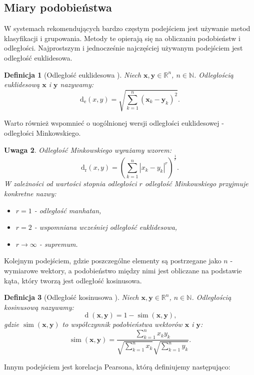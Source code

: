 \documentclass[12pt,a4paper]{report}
\newtheorem{df}{Definicja}[chapter]
\newtheorem{uwaga}[df]{Uwaga}
\newcommand{\setR}{\mathbb{R}}
\newcommand{\setN}{\mathbb{N}}
\newcommand{\similarity}[2]{\operatorname{sim}\left({#1}, {#2} \right)}
\newcommand{\distance}[2]{\operatorname{d}\left({#1}, {#2} \right)}
\newcommand{\distancee}[2]{\operatorname{d_r}\left({#1}, {#2} \right)}
\newcommand{\distanceee}[2]{\operatorname{d_e}\left({#1}, {#2} \right)}
\begin{document}
\subsection{Miary podobieństwa}
W systemach rekomendujących bardzo częstym podejściem jest używanie metod klasyfikacji i grupowania. Metody te opierają się na obliczaniu podobieństw i odległości.
Najprostszym i jednocześnie najczęściej używanym podejściem jest odległość euklidesowa.

\begin{df}[Odległość euklidesowa \citep{rsh}]%

Niech $\mathbf{x},\mathbf{y} \in \setR^n $, $n \in\setN$. Odległością euklidesową $\mathbf{x}$ i $\mathbf{y}$ nazywamy:
$$
\distanceee{x}{y} = \sqrt{\sum_{k=1}^n(\mathbf{x}_k-\mathbf{y}_k)^2}.
$$
\end{df}

Warto również wspomnieć o uogólnionej wersji odległości euklidesowej - odległości Minkowskiego.
\begin{uwaga}
Odległość Minkowskiego wyrażamy wzorem:
$$
\distancee{x}{y} = (\sum_{k=1}^n|x_k-y_k|^r)^{\frac{1}{r}}.
$$
W zależności od wartości stopnia odległości $r$ odległość Minkowskiego przyjmuje konkretne nazwy:
\begin{itemize}
\item $r=1$ - odległość manhatan,
\item $r=2$ - wspomniana wcześniej odległość euklidesowa,
\item $r \to \infty $ - supremum. 
\end{itemize}
\end{uwaga}
Kolejnym podejściem, gdzie poszczególne elementy są postrzegane jako $n$ - wymiarowe wektory, a podobieństwo między nimi jest obliczane na podstawie kąta, który tworzą jest odległość kosinusowa.

\begin{df}[Odległość kosinusowa \citep{rsh}] %
Niech $\mathbf{x},\mathbf{y} \in \setR^n $, $n \in\setN$. Odległością kosinusową nazywamy:
$$
\distance{\mathbf{x}}{\mathbf{y}} = 1 - \similarity{\mathbf{x}}{\mathbf{y}},
$$ 
gdzie $\similarity{\mathbf{x}}{\mathbf{y}}$ to współczynnik podobieństwa wektorów $\mathbf{x}$ i $\mathbf{y}$:
$$
\similarity{\mathbf{x}}{\mathbf{y}} = \frac{\sum_{k=1}^n x_k y_k}{\sqrt{\sum_{k=1}^n x_k}\sqrt{\sum_{k=1}^n y_k}}.
$$
\end{df}
Innym podejściem jest korelacja Pearsona, którą definiujemy następująco:
\end{document}
